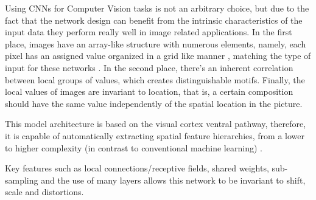 \documentclass[class=report, crop=false, a4paper, 12pt]{standalone}
\begin{document}
\par Using CNNs for Computer Vision tasks is not an arbitrary choice, but due to the fact that the network design can benefit from the intrinsic characteristics of the input data \autocite{lecunDeepLearning2015} they perform really well in image related applications. In the first place, images have an array-like structure with numerous elements, namely, each pixel has an assigned value organized in a grid like manner \autocite{yamashitaConvolutionalNeuralNetworks2018}, matching the type of input for these networks \autocite{lecunDeepLearning2015}. In the second place, there's an inherent correlation between local groups of values, which creates distinguishable motifs. Finally, the local values of images are invariant to location, that is, a certain composition should have the same value independently of the spatial location in the picture. 



This model architecture is based on the visual cortex ventral pathway, therefore, it is capable of automatically extracting spatial feature hierarchies, from a lower to higher complexity (in contrast to conventional machine learning) \autocite{lecunDeepLearning2015,yamashitaConvolutionalNeuralNetworks2018,guRecentAdvancesConvolutional2018,alzubaidiReviewDeepLearning2021}.


Key features such as local connections/receptive fields, shared weights, sub-sampling and the use of many layers allows this network to be invariant to shift, scale and distortions.



\end{document}
